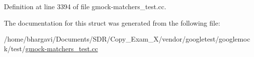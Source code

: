 Definition at line 3394 of file gmock-\/matchers\+\_\+test.\+cc.



The documentation for this struct was generated from the following file\+:\begin{DoxyCompactItemize}
\item 
/home/bhargavi/\+Documents/\+S\+D\+R/\+Copy\+\_\+\+Exam\+\_\+X/vendor/googletest/googlemock/test/\hyperlink{gmock-matchers__test_8cc}{gmock-\/matchers\+\_\+test.\+cc}\end{DoxyCompactItemize}

